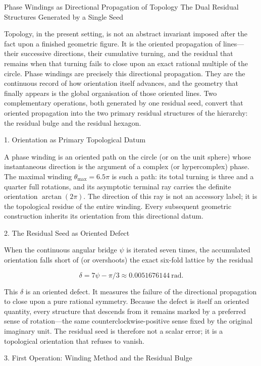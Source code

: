Phase Windings as Directional Propagation of Topology  
The Dual Residual Structures Generated by a Single Seed

Topology, in the present setting, is not an abstract invariant imposed after the fact upon a finished geometric figure. It is the oriented propagation of lines—their successive directions, their cumulative turning, and the residual that remains when that turning fails to close upon an exact rational multiple of the circle. Phase windings are precisely this directional propagation. They are the continuous record of how orientation itself advances, and the geometry that finally appears is the global organisation of those oriented lines. Two complementary operations, both generated by one residual seed, convert that oriented propagation into the two primary residual structures of the hierarchy: the residual bulge and the residual hexagon.

1. Orientation as Primary Topological Datum

A phase winding is an oriented path on the circle (or on the unit sphere) whose instantaneous direction is the argument of a complex (or hypercomplex) phase. The maximal winding \(\theta_{\max}=6.5\pi\) is such a path: its total turning is three and a quarter full rotations, and its asymptotic terminal ray carries the definite orientation \(\arctan(2\pi)\). The direction of this ray is not an accessory label; it is the topological residue of the entire winding. Every subsequent geometric construction inherits its orientation from this directional datum.

2. The Residual Seed as Oriented Defect

When the continuous angular bridge \(\psi\) is iterated seven times, the accumulated orientation falls short of (or overshoots) the exact six-fold lattice by the residual

\[
\delta=7\psi-\pi/3\approx0.0051676144\ \mathrm{rad}.
\]

This \(\delta\) is an oriented defect. It measures the failure of the directional propagation to close upon a pure rational symmetry. Because the defect is itself an oriented quantity, every structure that descends from it remains marked by a preferred sense of rotation—the same counterclockwise-positive sense fixed by the original imaginary unit. The residual seed is therefore not a scalar error; it is a topological orientation that refuses to vanish.

3. First Operation: Winding Method and the Residual Bulge

